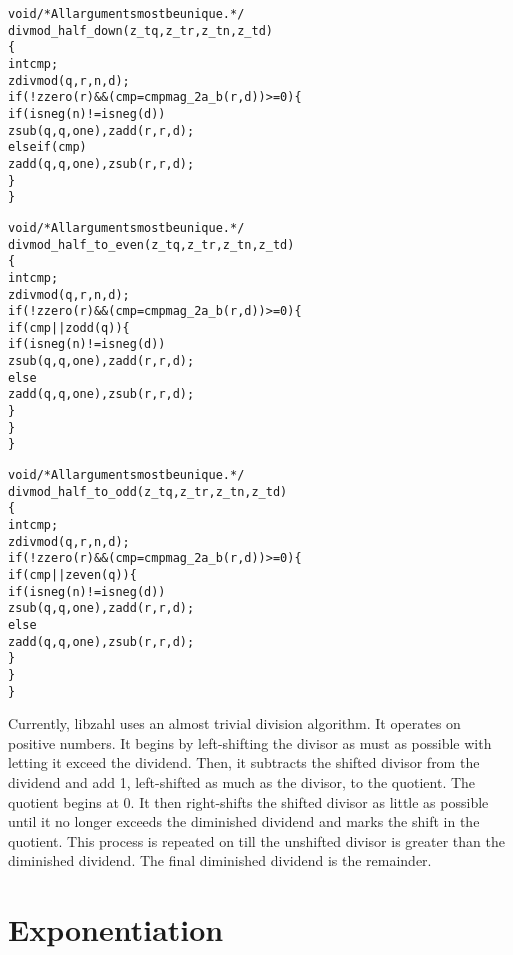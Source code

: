 \begin{alltt}
   void \textcolor{c}{/* \textrm{All arguments most be unique.} */}
   divmod_half_down(z_t q, z_t r, z_t n, z_t d)
   \{
       int cmp;
       zdivmod(q, r, n, d);
       if (!zzero(r) && (cmp = cmpmag_2a_b(r, d)) >= 0) \{
           if (isneg(n) != isneg(d))
               zsub(q, q, one), zadd(r, r, d);
           else if (cmp)
               zadd(q, q, one), zsub(r, r, d);
       \}
   \}
\end{alltt}

\begin{alltt}
   void \textcolor{c}{/* \textrm{All arguments most be unique.} */}
   divmod_half_to_even(z_t q, z_t r, z_t n, z_t d)
   \{
       int cmp;
       zdivmod(q, r, n, d);
       if (!zzero(r) && (cmp = cmpmag_2a_b(r, d)) >= 0) \{
           if (cmp || zodd(q)) \{
               if (isneg(n) != isneg(d))
                   zsub(q, q, one), zadd(r, r, d);
               else
                   zadd(q, q, one), zsub(r, r, d);
           \}
       \}
   \}
\end{alltt}

\newpage
\begin{alltt}
   void \textcolor{c}{/* \textrm{All arguments most be unique.} */}
   divmod_half_to_odd(z_t q, z_t r, z_t n, z_t d)
   \{
       int cmp;
       zdivmod(q, r, n, d);
       if (!zzero(r) && (cmp = cmpmag_2a_b(r, d)) >= 0) \{
           if (cmp || zeven(q)) \{
               if (isneg(n) != isneg(d))
                   zsub(q, q, one), zadd(r, r, d);
               else
                   zadd(q, q, one), zsub(r, r, d);
           \}
       \}
   \}
\end{alltt}

Currently, libzahl uses an almost trivial division
algorithm. It operates on positive numbers. It begins
by left-shifting the divisor as must as possible with
letting it exceed the dividend. Then, it subtracts
the shifted divisor from the dividend and add 1,
left-shifted as much as the divisor, to the quotient.
The quotient begins at 0. It then right-shifts
the shifted divisor as little as possible until
it no longer exceeds the diminished dividend and
marks the shift in the quotient. This process is
repeated on till the unshifted divisor is greater
than the diminished dividend. The final diminished
dividend is the remainder.



\newpage
\section{Exponentiation}
\label{sec:Exponentiation}


